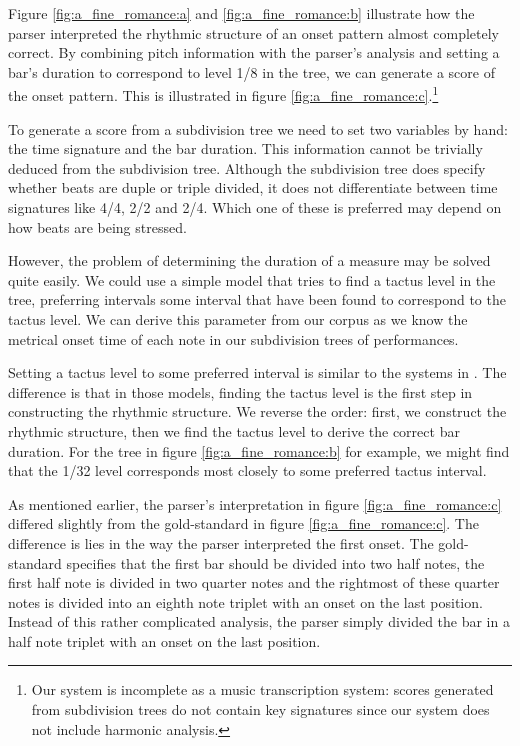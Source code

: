 Figure \ref{fig:a_fine_romance:a} and \ref{fig:a_fine_romance:b} illustrate how the parser interpreted the rhythmic structure of an onset pattern almost completely correct. By combining pitch information with the parser's analysis and setting a bar's duration to correspond to level 1/8 in the tree, we can generate a score of the onset pattern. This is illustrated in figure \ref{fig:a_fine_romance:c}.\footnote{Our system is incomplete as a music transcription system: scores generated from subdivision trees do not contain key signatures since our system does not include harmonic analysis.}

To generate a score from a subdivision tree we need to set two variables by hand: the time signature and the bar duration. This information cannot be trivially deduced from the subdivision tree. Although the subdivision tree does specify whether beats are duple or triple divided, it does not differentiate between time signatures like 4/4, 2/2 and 2/4. Which one of these is preferred may depend on how beats are being stressed.

However, the problem of determining the duration of a measure may be solved quite easily. We could use a simple model that tries to find a tactus level in the tree, preferring intervals some interval that have been found to correspond to the tactus level. We can derive this parameter from our corpus as we know the metrical onset time of each note in our subdivision trees of performances. 

Setting a tactus level to some preferred interval is similar to the systems in  \citet{temperley2009unified, temperley2007music}. The difference is that in those models, finding the tactus level is the first step in constructing the rhythmic structure. We reverse the order: first, we construct the rhythmic structure, then we find the tactus level to derive the correct bar duration. For the tree in figure \ref{fig:a_fine_romance:b} for example, we might find that the 1/32 level corresponds most closely to some preferred tactus interval.

As mentioned earlier, the parser's interpretation in figure \ref{fig:a_fine_romance:c} differed slightly from the gold-standard in figure \ref{fig:a_fine_romance:c}. The difference is lies in the way the parser interpreted the first onset. The gold-standard specifies that the first bar should be divided into two half notes, the first half note is divided in two quarter notes and the rightmost of these quarter notes is divided into an eighth note triplet with an onset on the last position. Instead of this rather complicated analysis, the parser simply divided the bar in a half note triplet with an onset on the last position. 

